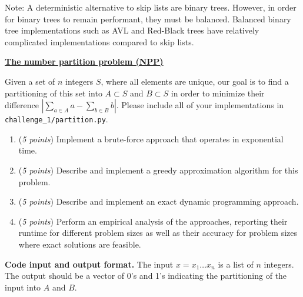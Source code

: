 \documentclass{hw}
\newcommand{\io}{\textbf{Code input and output format.} }
\begin{document}
\begin{problem}

Note: A deterministic alternative to skip lists are binary trees.
However, in order for binary trees to remain performant,
they must be balanced. Balanced binary tree implementations such as
AVL and Red-Black trees have relatively complicated implementations compared to skip lists.

\end{problem}
\newpage

 
\begin{challenge}
    \textbf{\href{https://en.wikipedia.org/wiki/Partition_problem}{The number partition problem (NPP)}}

    Given a set of $n$ integers $S$, where all elements are unique,
    our goal is to find a partitioning of this set into $A\subset S$ and $B\subset S$
    in order to minimize their difference $|\sum_{a\in A}a - \sum_{b\in B}b|$.
    Please include all of your implementations in \texttt{challenge\_1/partition.py}.

    \begin{enumerate}[label={(\alph*)}]
    \item (\textit{5 points}) Implement a brute-force approach that operates in exponential time.

    \item (\textit{5 points}) Describe and implement a greedy approximation algorithm for this problem.

    \item (\textit{5 points}) Describe and implement an exact dynamic programming approach.

    \item (\textit{5 points}) Perform an empirical analysis of the approaches,
    reporting their runtime for different problem sizes as well as their accuracy
    for problem sizes where exact solutions are feasible.
    \end{enumerate}

    \io The input $x=x_1 \ldots x_n$ is a list of $n$ integers.
    The output should be a vector of 0's and 1's
    indicating the partitioning of the input into $A$ and $B$.
\end{challenge}

\end{document}
